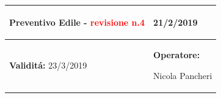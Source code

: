 \documentclass[a4paper]{article}
\begin{document}
                                  \begin{center}
                                  \begin{tabular}{|L{89mm} R{60mm}| }
                                  \hline
                                  \vspace{2.5mm}
                                  \begin{spacing}{0}
                                \textbf{Preventivo Edile - } \textcolor{red}{revisione n.4}
                                  \end{spacing}&
                                  \vspace{2.5mm}
                                  \begin{spacing}{0}

                                21/2/2019

                                  \end{spacing}\\
                                  \hline
                                  \vspace{2.5mm}
                                  \begin{spacing}{0}

                                
                                        \textbf{Validit\'a:}
                                   23/3/2019
                                  \end{spacing} &
                                  \vspace{2.5mm}
                                  \begin{spacing}{0}
                                    \textbf{Operatore:}

                               Nicola Pancheri
                                  \end{spacing} \\
                                  \hline
                                  \end{tabular}
                                  \end{center}
                               
\end{document}
